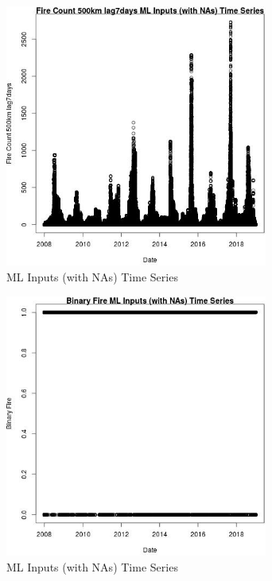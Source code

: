 \begin{figure} 
\centering  
\includegraphics[width=0.77\textwidth]{Code_Outputs/Report_ML_input_PM25_Step4_part_f_de_duplicated_aveswNAs_Fire_Count_500km_lag7daysvDate.jpg} 
\caption{\label{fig:Report_ML_input_PM25_Step4_part_f_de_duplicated_aveswNAsFire_Count_500km_lag7daysvDate}ML Inputs (with NAs) Time Series} 
\end{figure} 
 

\clearpage 

\begin{figure} 
\centering  
\includegraphics[width=0.77\textwidth]{Code_Outputs/Report_ML_input_PM25_Step4_part_f_de_duplicated_aveswNAs_Binary_FirevDate.jpg} 
\caption{\label{fig:Report_ML_input_PM25_Step4_part_f_de_duplicated_aveswNAsBinary_FirevDate}ML Inputs (with NAs) Time Series} 
\end{figure} 
 

